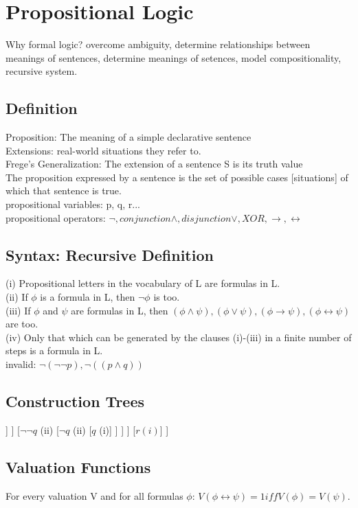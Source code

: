 \section{Propositional Logic}
Why formal logic? overcome ambiguity, determine relationships between meanings of sentences, determine meanings of setences, model compositionality, recursive system.
\subsection*{Definition}
Proposition: The meaning of a simple declarative sentence \\
Extensions: real-world situations they refer to. \\
Frege’s Generalization: The extension of a sentence S is its truth value \\
The proposition expressed by a sentence is the set of possible cases [situations] of which that sentence is true. \\
propositional variables: p, q, r...\\
propositional operators: $\neg, conjunction \land, disjunction \lor, XOR, \to, \leftrightarrow$
\subsection*{Syntax: Recursive Definition}
(i) Propositional letters in the vocabulary of L are formulas in L.\\
(ii) If $\phi$ is a formula in L, then $\neg \phi$ is too.\\
(iii) If $\phi$ and $\psi$ are formulas in L, then $(\phi \land \psi), (\phi \lor \psi), (\phi \to \psi), (\phi \leftrightarrow \psi)$ are too.\\
(iv) Only that which can be generated by the clauses (i)-(iii) in a finite number of steps is a formula in L.\\
invalid: $\neg (\neg \neg p), \neg ((p \land q))$ 
\subsection*{Construction Trees}
\begin{forest}
[$(\neg (p \lor q) \to \neg \neg q) \leftrightarrow r$ $(iii. \leftrightarrow)$
	[$(\neg (p \lor q) \to \neg \neg q)$ $(iii. \to)$
		[$\neg (p \lor q)$ $(ii)$
			[$p \lor q$ $(iii. \lor)$
				[$p$ (i)]
				[$q$ (i)]
			]			
		]
		[$\neg \neg q$ (ii)
			[$\neg q$ (ii)
				[$q$ (i)]
			]
		]
	]
	[$r(i)$]
]
\end{forest}
\subsection*{Valuation Functions}
For every valuation V and for all formulas $\phi$: $V(\phi \leftrightarrow \psi) = 1 iff V(\phi) = V(\psi)$.